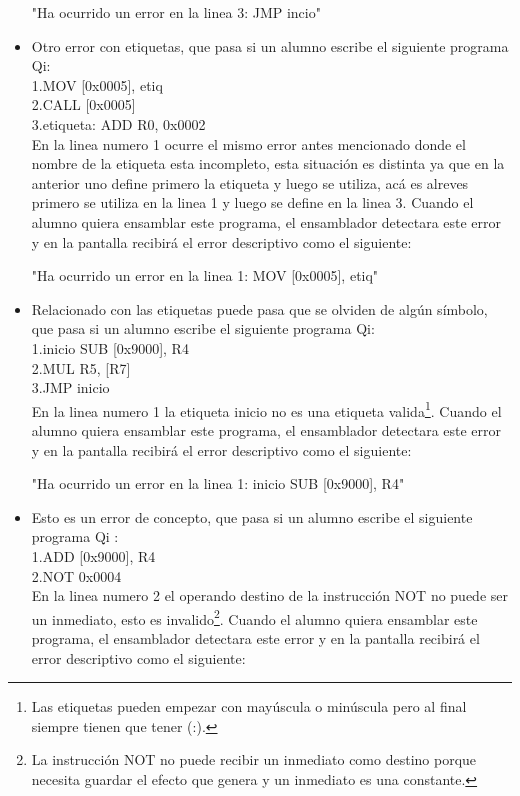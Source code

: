 \begin{itemize}
"Ha ocurrido un error en la linea 3: JMP incio" \\ 

\item Otro error con etiquetas, que pasa si un alumno escribe el siguiente programa Qi:\\

1.MOV [0x0005], etiq \\
2.CALL [0x0005] \\
3.etiqueta: ADD R0, 0x0002 \\

En la linea numero 1 ocurre el mismo error antes mencionado donde el nombre de la etiqueta esta incompleto, esta situación es distinta ya que en la anterior uno define primero la etiqueta y luego se utiliza, acá es alreves primero se utiliza en la linea 1 y luego se define en la linea 3. Cuando el alumno quiera ensamblar este programa, el ensamblador detectara este error y en la pantalla recibirá el error descriptivo como el siguiente:

"Ha ocurrido un error en la linea 1: MOV [0x0005], etiq" \\


\item Relacionado con las etiquetas puede pasa que se olviden de algún símbolo, que pasa si un alumno escribe el siguiente programa Qi:\\

1.inicio SUB [0x9000], R4 \\
2.MUL R5, [R7] \\
3.JMP inicio \\

En la linea numero 1 la etiqueta inicio no es una etiqueta valida\footnote{Las etiquetas pueden empezar con mayúscula o minúscula pero al final siempre tienen que tener (:).}. Cuando el alumno quiera ensamblar este programa, el ensamblador detectara este error y en la pantalla recibirá el error descriptivo como el siguiente:

"Ha ocurrido un error en la linea 1: inicio SUB [0x9000], R4" \\ 


\item Esto es un error de concepto, que pasa si un alumno escribe el siguiente programa Qi :\\

1.ADD [0x9000], R4 \\
2.NOT 0x0004 \\

En la linea numero 2 el operando destino de la instrucción NOT no puede ser un inmediato, esto es invalido\footnote{La instrucción NOT no puede recibir un inmediato como destino porque necesita guardar el efecto que genera y un inmediato es una constante.}. Cuando el alumno quiera ensamblar este programa, el ensamblador detectara este error y en la pantalla recibirá el error descriptivo como el siguiente:


\end{itemize}
